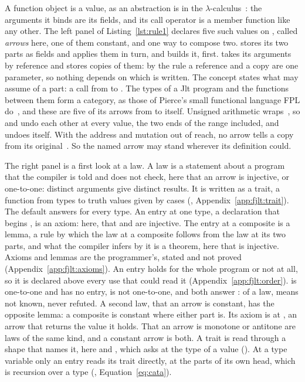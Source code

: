 A function object is a value, as an abstraction is in the $\lambda$-calculus~\cite{pierce2002tapl}: the arguments it binds are its fields, and its call operator is a  member function like any other.
The left panel of Listing~\ref{lst:rule1} declares five such values on , called \emph{arrows} here, one of them constant, and one way to compose two.
 stores its two parts as fields and applies them in turn, and  builds it,  first.
\cppinline{>>} takes its arguments by  reference and  stores copies of them: by the rule a reference and a copy are one parameter, so nothing depends on which is written.
The concept  states what  may assume of a part: a  call from  to .
The types of a Jlt program and the functions between them form a category, as those of Pierce's small functional language FPL do~\cite[Example~1.1.15]{pierce1991basic}, and these are five of its arrows from  to itself.
Unsigned arithmetic wraps~\cite[{\texttt{basic.fundamental}}]{cpp23standard}, so  and  undo each other at every value, the two ends of the range included, and  undoes itself.
With the address and mutation out of reach, no arrow tells a copy from its original~\cite{mazur2008equal}.
So the named arrow  may stand wherever its definition could.

The right panel is a first look at a law.
A law is a statement about a program that the compiler is told and does not check, here that an arrow is injective, or one-to-one: distinct arguments give distinct results.
It is written as a trait, a function from types to truth values given by cases (\RuleTwo{}, Appendix~\ref{app:fjlt:trait}).
The default answers  for every type.
An entry at one type, a declaration that begins , is an axiom: here, that  and  are injective.
The entry at a composite is a lemma, a rule by which the law at a composite follows from the law at its two parts, and what the compiler infers by it is a theorem, here that  is injective.
Axioms and lemmas are the programmer's, stated and not proved (Appendix~\ref{app:fjlt:axioms}).
An entry holds for the whole program or not at all, so it is declared above every use that could read it (Appendix~\ref{app:fjlt:order}).
 is one-to-one and has no entry,  is not one-to-one, and both answer : of a law,  means not known, never refuted.
A second law, that an arrow is constant, has the opposite lemma: a composite is constant where either part is.
Its axiom is at , an arrow that returns the value it holds.
That an arrow is monotone or antitone are laws of the same kind, and a constant arrow is both.
A trait is read through a shape that names it, here  and , which  asks at the type of a value (\RuleTwo{}).
At a type variable only an entry reads its trait directly, at the parts of its own head, which is recursion over a type (\RuleThree{}, Equation~\eqref{eq:cata}).

